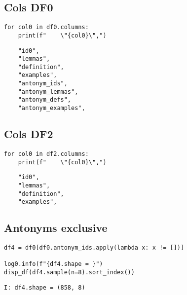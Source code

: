 \documentclass[a4paper,10pt,onecolumn,oneside,openright]{article}
\begin{document}
\subsection{Cols DF0}
\label{sec:org07a069e}
\begin{verbatim}
for col0 in df0.columns:
    print(f"    \"{col0}\",")
\end{verbatim}

\begin{verbatim}
    "id0",
    "lemmas",
    "definition",
    "examples",
    "antonym_ids",
    "antonym_lemmas",
    "antonym_defs",
    "antonym_examples",
\end{verbatim}

\subsection{Cols DF2}
\label{sec:orgfc201c5}
\begin{verbatim}
for col0 in df2.columns:
    print(f"    \"{col0}\",")
\end{verbatim}

\begin{verbatim}
    "id0",
    "lemmas",
    "definition",
    "examples",
\end{verbatim}


\subsection{Antonyms exclusive}
\label{sec:org5b959b1}
\begin{verbatim}
df4 = df0[df0.antonym_ids.apply(lambda x: x != [])]

log0.info(f"{df4.shape = }")
disp_df(df4.sample(n=8).sort_index())
\end{verbatim}

\begin{verbatim}
I: df4.shape = (858, 8)
\end{verbatim}
\end{document}
